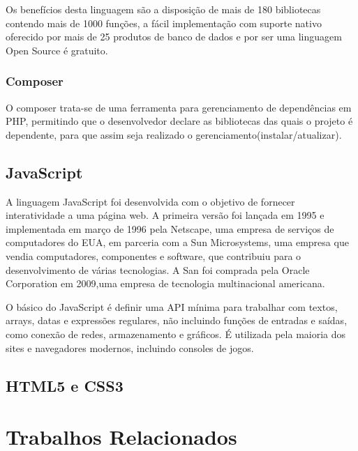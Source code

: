 Os benefícios desta linguagem são a disposição de mais de 180 bibliotecas contendo mais de 1000 funções, a fácil implementação com suporte nativo oferecido por mais de 25 produtos de banco de dados e por ser uma linguagem Open Source é gratuito.

\subsubsection{Composer}

O composer trata-se de uma ferramenta para gerenciamento de dependências em PHP, permitindo que o desenvolvedor declare as bibliotecas das quais o projeto é dependente, para que assim seja realizado o gerenciamento(instalar/atualizar). \cite{composer}


\subsection{JavaScript}

A linguagem JavaScript foi desenvolvida com o objetivo de fornecer interatividade a uma página web. A primeira versão foi lançada em 1995 e implementada em março de 1996 pela Netscape, uma empresa de serviços de computadores do EUA, em parceria com a Sun Microsystems, uma empresa que vendia computadores, componentes e software, que contribuiu para o desenvolvimento de várias tecnologias. A San foi comprada pela Oracle Corporation em 2009,uma empresa de tecnologia multinacional americana.

O básico do JavaScript é definir uma API mínima para trabalhar com textos, arrays, datas e expressões regulares, não incluindo funções de entradas e saídas, como conexão de redes, armazenamento e gráficos. É utilizada pela maioria dos sites e navegadores modernos, incluindo consoles de jogos.\cite{flanagan2004javascript}

\subsection{HTML5 e CSS3}

\section{Trabalhos Relacionados}
